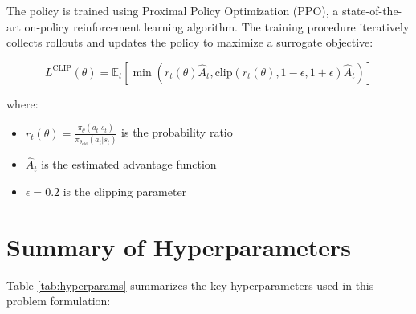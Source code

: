 \documentclass[12pt,a4paper]{article}
\begin{document}
\begin{itemize}
\begin{itemize}
The policy is trained using Proximal Policy Optimization (PPO), a state-of-the-art on-policy reinforcement learning algorithm. The training procedure iteratively collects rollouts and updates the policy to maximize a surrogate objective:

\begin{equation}
L^{\text{CLIP}}(\theta) = \mathbb{E}_t \left[ \min(r_t(\theta) \hat{A}_t, \text{clip}(r_t(\theta), 1 - \epsilon, 1 + \epsilon) \hat{A}_t) \right]
\end{equation}

where:
\begin{itemize}
\item $r_t(\theta) = \frac{\pi_\theta(a_t | s_t)}{\pi_{\theta_{\text{old}}}(a_t | s_t)}$ is the probability ratio
\item $\hat{A}_t$ is the estimated advantage function
\item $\epsilon = 0.2$ is the clipping parameter
\end{itemize}

\section{Summary of Hyperparameters}

Table \ref{tab:hyperparams} summarizes the key hyperparameters used in this problem formulation:


\end{itemize}
\end{itemize}
\end{document}
